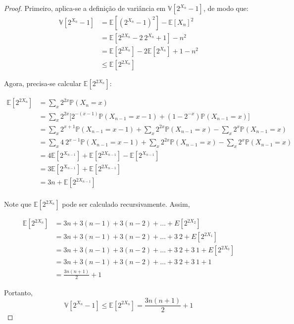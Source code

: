\begin{proof}
Primeiro, aplica-se a definição de variância em $\mathbb{V}[2^{X_n} - 1]$, de modo que:
\begin{align*}
  \mathbb{V}[2^{X_n} - 1] 
    &= \mathbb{E}[(2^{X_n} - 1) ^ 2] - \mathbb{E}[X_n]^2  \\
    &= \mathbb{E}[2^{2X_n} -2 \ 2^{X_n} + 1] - n^2 \\
    &= \mathbb{E}[2^{2X_n}] -2 \mathbb{E} [2^{X_n}] + 1 - n^2 \\
    &\leq \mathbb{E}[2^{2X_n}]
\end{align*}

Agora, precisa-se calcular $\mathbb{E}[2^{2X_n}]$:

\begin{align*}
  \mathbb{E}[2^{2X_n}]  
    &=  \sum_{x} 2^{2x} \mathbb{P}(X_n = x) \\
    &=  \sum_{x} 2^{2x} \Big[ 2^{-(x-1)} \mathbb{P}(X_{n-1} = x-1) + (1 - 2^{-x}) \mathbb{P}(X_{n-1} = x) \Big] \\
    &=  \sum_{x} 2^{x+1} \mathbb{P}(X_{n-1} = x-1) + \sum_{x} 2^{2x} \mathbb{P}(X_{n-1} = x) - \sum_{x} 2^{x} \mathbb{P}(X_{n-1} = x) \\
    &=  \sum_{x} 4 \ 2^{x-1} \mathbb{P}(X_{n-1} = x-1) + \sum_{x} 2^{2x} \mathbb{P}(X_{n-1} = x) - \sum_{x} 2^{x} \mathbb{P}(X_{n-1} = x)  \\
    &=  4 \mathbb{E}[2^{X_{n-1}}] + \mathbb{E}[2^{2X_{n-1}}] - \mathbb{E}[2^{X_{n-1}}]  \\
    &=  3 \mathbb{E}[2^{X_{n-1}}] + \mathbb{E}[2^{2X_{n-1}}]  \\
    &=  3 n + \mathbb{E}[2^{2X_{n-1}}]  \\
\end{align*}

Note que $\mathbb{E}[2^{2X_n}]$ pode ser calculado recursivamente. Assim,

\begin{align*}
  \mathbb{E}[2^{2X_{n}}] 
    &= 3n + 3(n-1) + 3(n-2) + \dots + E[2^{2X_2}] \\
    &= 3n + 3(n-1) + 3(n-2) + \dots + 3 \ 2 + E[2^{2X_1}] \\
    &= 3n + 3(n-1) + 3(n-2) + \dots + 3 \ 2 + 3 \ 1 + E[2^{2X_0}] \\
    &= 3n + 3(n-1) + 3(n-2) + \dots + 3 \ 2 + 3 \ 1 + 1 \\
    &= \frac{3n(n+1)}{2} + 1
\end{align*}

Portanto, 
\[ \mathbb{V}[2^{X_n} - 1] \leq \mathbb{E}[2^{2X_n}] = \frac{3n(n+1)}{2} + 1 \]

\end{proof}


